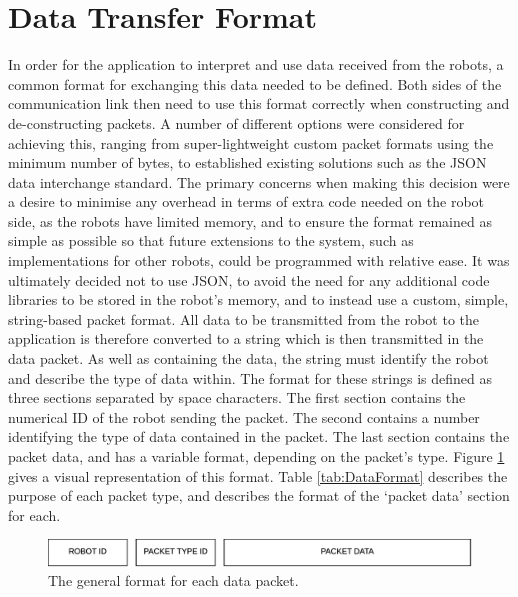 
\section{Data Transfer Format} \label{DataTransferFormat}
In order for the application to interpret and use data received from the robots, a common format for exchanging this data needed to be defined. Both sides of the communication link then need to use this format correctly when constructing and de-constructing packets. A number of different options were considered for achieving this, ranging from super-lightweight custom packet formats using the minimum number of bytes, to established existing solutions such as the JSON data interchange standard. The primary concerns when making this decision were a desire to minimise any overhead in terms of extra code needed on the robot side, as the robots have limited memory, and to ensure the format remained as simple as possible so that future extensions to the system, such as implementations for other robots, could be programmed with relative ease. It was ultimately decided not to use JSON, to avoid the need for any additional code libraries to be stored in the robot's memory, and to instead use a custom, simple, string-based packet format. All data to be transmitted from the robot to the application is therefore converted to a string which is then transmitted in the data packet. As well as containing the data, the string must identify the robot and describe the type of data within. The format for these strings is defined as three sections separated by space characters. The first section contains the numerical ID of the robot sending the packet. The second contains a number identifying the type of data contained in the packet. The last section contains the packet data, and has a variable format, depending on the packet's type. Figure \ref{fig:DataFormat} gives a visual representation of this format. Table \ref{tab:DataFormat} describes the purpose of each packet type, and describes the format of the `packet data' section for each.

\begin{figure}[h]
 \centering
 \includegraphics[scale=0.3]{Figures/DataFormat.png}
 \decoRule
 \caption[Data Format]{The general format for each data packet.}
 \label{fig:DataFormat}
\end{figure}

